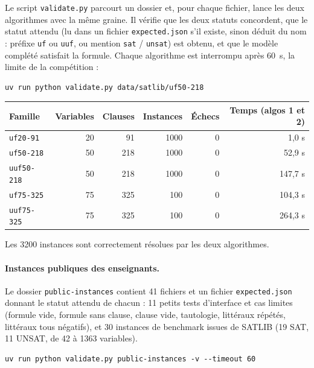 \documentclass[11pt,a4paper]{article}
\begin{document}
Le script \texttt{validate.py} parcourt un dossier et, pour chaque fichier,
lance les deux algorithmes avec la même graine. Il vérifie que les deux
statuts concordent, que le statut attendu (lu dans un fichier
\texttt{expected.json} s'il existe, sinon déduit du nom : préfixe
\texttt{uf} ou \texttt{uuf}, ou mention \texttt{sat} / \texttt{unsat}) est
obtenu, et que le modèle complété satisfait la formule. Chaque algorithme
est interrompu après 60~s, la limite de la compétition :
\begin{lstlisting}
uv run python validate.py data/satlib/uf50-218
\end{lstlisting}

\begin{center}
\begin{tabular}{lrrrrr}
  Famille & Variables & Clauses & Instances & Échecs & Temps (algos 1 et 2) \\
  \hline
  \texttt{uf20-91}   & 20 & 91  & 1000 & 0 & 1,0 s \\
  \texttt{uf50-218}  & 50 & 218 & 1000 & 0 & 52,9 s \\
  \texttt{uuf50-218} & 50 & 218 & 1000 & 0 & 147,7 s \\
  \texttt{uf75-325}  & 75 & 325 & 100  & 0 & 104,3 s \\
  \texttt{uuf75-325} & 75 & 325 & 100  & 0 & 264,3 s \\
\end{tabular}
\end{center}
Les 3200 instances sont correctement résolues par les deux algorithmes.

\paragraph{Instances publiques des enseignants.} Le dossier
\texttt{public-instances} contient 41 fichiers et un fichier
\texttt{expected.json} donnant le statut attendu de chacun : 11 petits tests
d'interface et cas limites (formule vide, formule sans clause, clause vide,
tautologie, littéraux répétés, littéraux tous négatifs), et 30 instances de
benchmark issues de SATLIB (19 SAT, 11 UNSAT, de 42 à 1363 variables).
\begin{lstlisting}
uv run python validate.py public-instances -v --timeout 60
\end{lstlisting}
\end{document}
